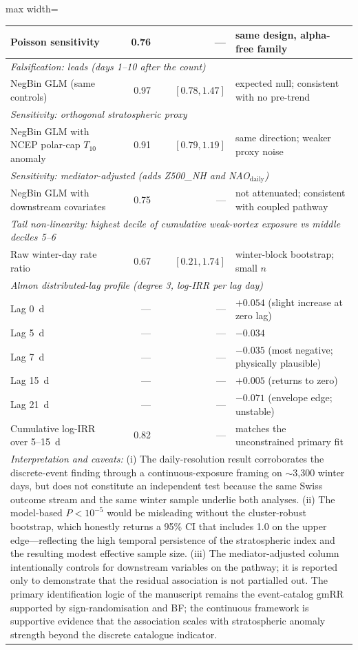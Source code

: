 \documentclass[11pt,letterpaper]{article}
\begin{document}
\begin{table}[!h]
\begin{adjustbox}{max width=\textwidth}
\begin{tabular}{lrrl}
Poisson sensitivity & 0.76 & --- & same design, alpha-free family \\
\midrule
\multicolumn{4}{l}{\emph{Falsification: leads (days 1--10 after the count)}} \\
NegBin GLM (same controls) & 0.97 & $[0.78, 1.47]$ & expected null; consistent with no pre-trend \\
\midrule
\multicolumn{4}{l}{\emph{Sensitivity: orthogonal stratospheric proxy}} \\
NegBin GLM with NCEP polar-cap $T_{10}$ anomaly & 0.91 & $[0.79, 1.19]$ & same direction; weaker proxy noise \\
\midrule
\multicolumn{4}{l}{\emph{Sensitivity: mediator-adjusted (adds Z500\_NH and NAO$_{\mathrm{daily}}$)}} \\
NegBin GLM with downstream covariates & 0.75 & --- & not attenuated; consistent with coupled pathway \\
\midrule
\multicolumn{4}{l}{\emph{Tail non-linearity: highest decile of cumulative weak-vortex exposure vs middle deciles 5--6}} \\
Raw winter-day rate ratio & 0.67 & $[0.21, 1.74]$ & winter-block bootstrap; small $n$ \\
\midrule
\multicolumn{4}{l}{\emph{Almon distributed-lag profile (degree 3, log-IRR per lag day)}} \\
Lag 0~d & --- & --- & $+0.054$ (slight increase at zero lag) \\
Lag 5~d & --- & --- & $-0.034$ \\
Lag 7~d & --- & --- & $-0.035$ (most negative; physically plausible) \\
Lag 15~d & --- & --- & $+0.005$ (returns to zero) \\
Lag 21~d & --- & --- & $-0.071$ (envelope edge; unstable) \\
Cumulative log-IRR over 5--15~d & 0.82 & --- & matches the unconstrained primary fit \\
\midrule
\multicolumn{4}{p{14cm}}{\emph{Interpretation and caveats:} (i) The daily-resolution result corroborates the discrete-event finding through a continuous-exposure framing on $\sim$3{,}300 winter days, but does not constitute an independent test because the same Swiss outcome stream and the same winter sample underlie both analyses. (ii) The model-based $P < 10^{-5}$ would be misleading without the cluster-robust bootstrap, which honestly returns a 95\% CI that includes 1.0 on the upper edge---reflecting the high temporal persistence of the stratospheric index and the resulting modest effective sample size. (iii) The mediator-adjusted column intentionally controls for downstream variables on the pathway; it is reported only to demonstrate that the residual association is not partialled out. The primary identification logic of the manuscript remains the event-catalog $\mathrm{gmRR}$ supported by sign-randomisation and BF; the continuous framework is supportive evidence that the association scales with stratospheric anomaly strength beyond the discrete catalogue indicator.} \\
\bottomrule
\end{tabular}
\end{adjustbox}
\end{table}
\end{document}
